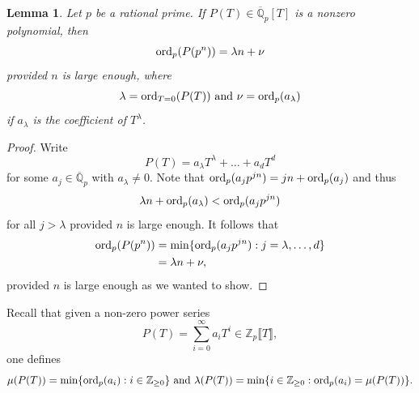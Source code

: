 \documentclass[11pt]{amsart}
\newtheorem{lemma}[theorem]{Lemma}
\numberwithin{equation}{section}
\theoremstyle{remark}
\theoremstyle{definition}
\begin{document}
\begin{lemma} \label{useful_r_t}
Let $p$ be a rational prime.  If $P(T) \in \overline{\mathbb{Q}}_{p}[T]$ is a nonzero polynomial, then 
$${\rm ord}_{p}(P(p^{n})) = \lambda n + \nu $$
provided $n$ is large enough, where 
$$\lambda = {\rm ord}_{T=0}(P(T)) \text{ and } \nu = {\rm ord}_{p}(a_{\lambda})$$
if $a_{\lambda}$ is the coefficient of $T^{\lambda}$.
\end{lemma}
\begin{proof}
Write 
$$P(T) = a_{\lambda}T^{\lambda} + \ldots + a_{d}T^{d} $$
for some $a_{j} \in \overline{\mathbb{Q}}_{p}$ with $a_{\lambda} \neq 0$.  Note that ${\rm ord}_{p}(a_{j}p^{jn}) = jn + {\rm ord}_{p}(a_{j})$ and thus
$$\lambda n + {\rm ord}_{p}(a_{\lambda}) < {\rm ord}_{p}(a_{j}p^{jn}) $$
for all $j > \lambda$ provided $n$ is large enough.  It follows that
\begin{equation*}
\begin{aligned} 
{\rm ord}_{p}(P(p^{n})) &= {\rm min}\{{\rm ord}_{p}(a_{j}p^{jn}) : j=\lambda,\ldots,d \}\\
&= \lambda n + \nu,
\end{aligned}
\end{equation*}
provided $n$ is large enough as we wanted to show.
\end{proof}

Recall that given a non-zero power series
$$P(T) = \sum_{i=0}^{\infty} a_{i}T^{i} \in \mathbb{Z}_{p}\llbracket T \rrbracket,$$ 
one defines
$$\mu(P(T)) = {\rm min}\{{\rm ord}_{p}(a_{i}): i \in \mathbb{Z}_{\ge 0}\}\text{ and } \lambda(P(T)) = {\rm min}\{i \in \mathbb{Z}_{\ge 0}: {\rm ord}_{p}(a_{i}) = \mu(P(T)) \}. $$
\end{document}

